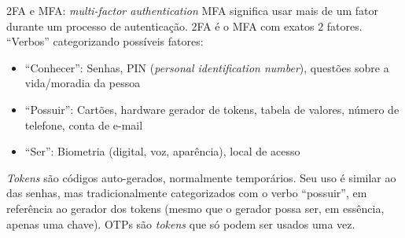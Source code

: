 \documentclass[utf8]{beamer}
\begin{document}
\begin{frame}{2FA e MFA: \emph{multi-factor authentication}}
  MFA significa usar mais de um fator
  durante um processo de autenticação.
  2FA é o MFA com exatos $2$ fatores.
  \vfill
  ``Verbos'' categorizando possíveis fatores:
  \begin{itemize}
    \item ``Conhecer'':
          Senhas, PIN (\emph{personal identification number}),
          questões sobre a vida/moradia da pessoa
    \item ``Possuir'':
          Cartões, hardware gerador de tokens, tabela de valores,
          número de telefone, conta de e-mail
    \item ``Ser'':
          Biometria (digital, voz, aparência), local de acesso
  \vfill
  \end{itemize}
  \vfill
  \emph{Tokens} são códigos auto-gerados, normalmente temporários.
  Seu uso é similar ao das senhas,
  mas tradicionalmente categorizados com o verbo ``possuir'',
  em referência ao gerador dos tokens
  (mesmo que o gerador possa ser, em essência, apenas uma chave).
  OTPs são \emph{tokens} que só podem ser usados uma vez.
\end{frame}
\end{document}
